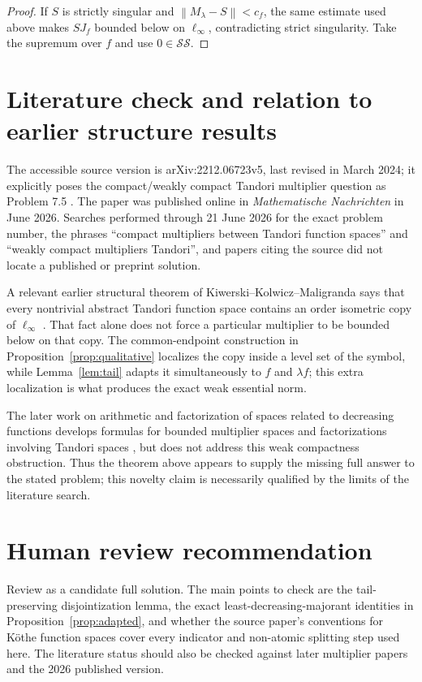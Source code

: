 \documentclass[11pt]{article}
\theoremstyle{remark}
\newcommand{\StrictSing}{\mathcal{SS}}
\newcommand{\norm}[1]{\left\lVert #1\right\rVert}
\begin{document}
\begin{proof}
If $S$ is strictly singular and $\norm{M_\lambda-S}<c_f$, the same estimate
used above makes $SJ_f$ bounded below on $\ell_\infty$, contradicting strict
singularity.  Take the supremum over $f$ and use $0\in\StrictSing$.
\end{proof}

\section{Literature check and relation to earlier structure results}

The accessible source version is arXiv:2212.06723v5, last revised in March
2024; it explicitly poses the compact/weakly compact Tandori multiplier
question as Problem 7.5 \cite{KT}.  The paper was published online in
\emph{Mathematische Nachrichten} in June 2026.  Searches performed through
21 June 2026 for the exact problem number, the phrases ``compact multipliers
between Tandori function spaces'' and ``weakly compact multipliers Tandori'',
and papers citing the source did not locate a published or preprint solution.

A relevant earlier structural theorem of Kiwerski--Kolwicz--Maligranda says
that every nontrivial abstract Tandori function space contains an order
isometric copy of $\ell_\infty$ \cite[Proposition 4.8]{KKM}.  That fact alone
does not force a particular multiplier to be bounded below on that copy.  The
common-endpoint construction in Proposition~\ref{prop:qualitative} localizes
the copy inside a level set of the symbol, while Lemma~\ref{lem:tail} adapts
it simultaneously to $f$ and $\lambda f$; this extra localization is what
produces the exact weak essential norm.

The later work on arithmetic and factorization of spaces related to
decreasing functions develops formulas for bounded multiplier spaces and
factorizations involving Tandori spaces \cite{KTamalgams}, but does not
address this weak compactness obstruction.  Thus the theorem above appears
to supply the missing full answer to the stated problem; this novelty claim
is necessarily qualified by the limits of the literature search.

\section{Human review recommendation}

Review as a candidate full solution.  The main points to check are the
tail-preserving disjointization lemma, the exact least-decreasing-majorant
identities in Proposition~\ref{prop:adapted}, and whether the source
paper's conventions for K\"othe function spaces cover every indicator and
non-atomic splitting step used here.  The literature status should also be
checked against later multiplier papers and the 2026 published version.
\end{document}
